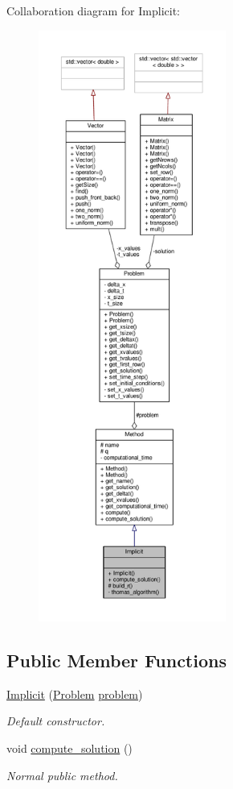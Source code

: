 Collaboration diagram for Implicit\+:
\nopagebreak
\begin{figure}[H]
\begin{center}
\leavevmode
\includegraphics[height=550pt]{classImplicit__coll__graph}
\end{center}
\end{figure}
\subsection*{Public Member Functions}
\begin{DoxyCompactItemize}
\item 
\hyperlink{classImplicit_a5bc81959cd5329526f1c2b7e6e050050}{Implicit} (\hyperlink{classProblem}{Problem} \hyperlink{classMethod_a29a08a679b5d30a8c813766308205041}{problem})
\begin{DoxyCompactList}\small\item\em Default constructor. \end{DoxyCompactList}\item 
void \hyperlink{classImplicit_a1d6b7250da6d3a417baefe7328635d45}{compute\+\_\+solution} ()
\begin{DoxyCompactList}\small\item\em Normal public method. \end{DoxyCompactList}\end{DoxyCompactItemize}

